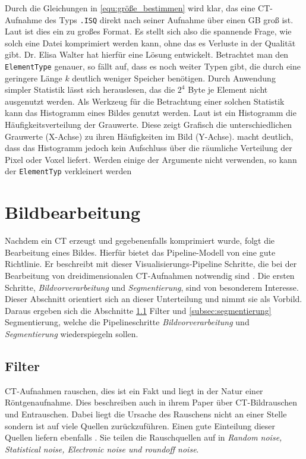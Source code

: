 Durch die Gleichungen in \ref{equ:größe_bestimmen} wird klar, das eine CT-Aufnahme
des Typs \texttt{.ISQ} direkt nach seiner Aufnahme über einen GB groß ist. Laut \citet{poliklinikLMU}
ist dies ein zu großes Format. Es stellt sich also die spannende Frage, wie
solch eine Datei komprimiert werden kann, ohne das es Verluste in der Qualität gibt.
Dr. Elisa Walter hat hierfür eine Lösung entwickelt. Betrachtet man den \texttt{ElementType}
genauer, so fällt auf, dass es noch weiter Typen gibt, die durch eine geringere
Länge $k$ deutlich weniger Speicher benötigen. Durch Anwendung simpler Statistik
lässt sich herauslesen, das die $2^{4}$ Byte je Element nicht ausgenutzt werden.
Als Werkzeug für die Betrachtung einer solchen Statistik kann das Histogramm eines
Bildes genutzt werden. Laut \citet[Seite 249]{jahne2024} ist ein Histogramm die
Häufigkeitsverteilung der Grauwerte. Diese zeigt Grafisch die unterschiedlichen Grauwerte
(X-Achse) zu ihren Häufigkeiten im Bild (Y-Achse). \citet[Seite 249]{jahne2024}
macht deutlich, dass das Histogramm jedoch kein Aufschluss über die räumliche Verteilung
der Pixel oder Voxel liefert. Werden einige der Argumente nicht verwenden, so kann
der \texttt{ElementTyp} verkleinert werden

\section{Bildbearbeitung}
\label{sec:bildbearbeitung} Nachdem ein CT erzeugt und gegebenenfalls komprimiert
wurde, folgt die Bearbeitung eines Bildes. Hierfür bietet das Pipeline-Modell von
\citet[Seite 50]{handels2000} eine gute Richtlinie. Er beschreibt mit dieser
Visualisierungs-Pipeline Schritte, die bei der Bearbeitung von dreidimensionalen
CT-Aufnahmen notwendig sind \citep[vgl.][Seite 50]{handels2000}. Die ersten
Schritte, \textit{Bildvorverarbeitung} und \textit{Segmentierung}, sind von
besonderem Interesse. Dieser Abschnitt orientiert sich an dieser Unterteilung und
nimmt sie als Vorbild. Daraus ergeben sich die Abschnitte \ref{subsec:filter}
Filter und \ref{subsec:segmentierung} Segmentierung, welche die Pipelineschritte
\textit{Bildvorverarbeitung} und \textit{Segmentierung} wiederspiegeln sollen.

\subsection{Filter}
\label{subsec:filter} CT-Aufnahmen rauschen, dies ist ein Fakt und liegt in der
Natur einer Röntgenaufnahme. Dies beschreiben auch \citet[Kapitel 3]{diwakar2018}
in ihrem Paper über CT-Bildrauschen und Entrauschen. Dabei liegt die Ursache des
Rauschens nicht an einer Stelle sondern ist auf viele Quellen zurückzuführen. Einen
gute Einteilung dieser Quellen liefern ebenfalls \citet[Kapitel 3]{diwakar2018}.
Sie teilen die Rauschquellen auf in \textit{Random noise, Statistical noise,
Electronic noise und roundoff noise}.

